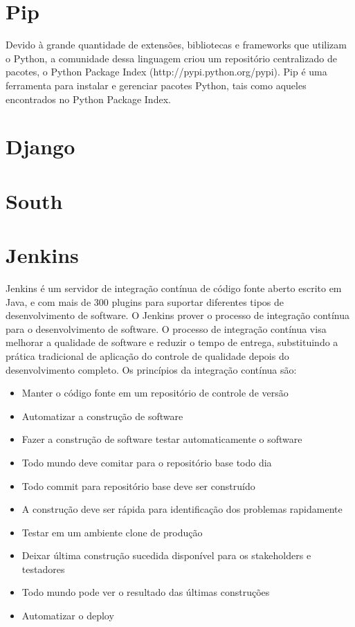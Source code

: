 \documentclass{abnt}
\begin{document}
	\section{Pip}
	
		Devido à grande quantidade de extensões, bibliotecas e frameworks que utilizam o Python, a comunidade dessa linguagem criou um repositório centralizado de pacotes, o Python Package Index (http://pypi.python.org/pypi).
		Pip é uma ferramenta para instalar e gerenciar pacotes Python, tais como aqueles encontrados no Python Package Index.\cite{PIPSITE}

	\section{Django}
	
	
	\section{South}
		
	
	\section{Jenkins}
			
				Jenkins é um servidor de integração contínua de código fonte aberto escrito em Java, e com mais de 300 plugins para
				suportar diferentes tipos de desenvolvimento de software. O Jenkins prover o processo de integração contínua para o
				desenvolvimento de software.
				O processo de integração contínua visa melhorar a qualidade de software e reduzir o tempo de entrega, substituindo a
				prática tradicional de aplicação do controle de qualidade depois do desenvolvimento completo. Os princípios da
				integração contínua são:
				\begin{itemize}
				  \item Manter o código fonte em um repositório de controle de versão
				  \item Automatizar a construção de software
				  \item Fazer a construção de software testar automaticamente o software
				  \item Todo mundo deve comitar para o repositório base todo dia
				  \item Todo commit para repositório base deve ser construído
				  \item A construção deve ser rápida para identificação dos problemas rapidamente
				  \item Testar em um ambiente clone de produção
				  \item Deixar última construção sucedida disponível para os stakeholders e testadores
				  \item Todo mundo pode ver o resultado das últimas construções
				  \item Automatizar o deploy
				\end{itemize}
				
\end{document}
